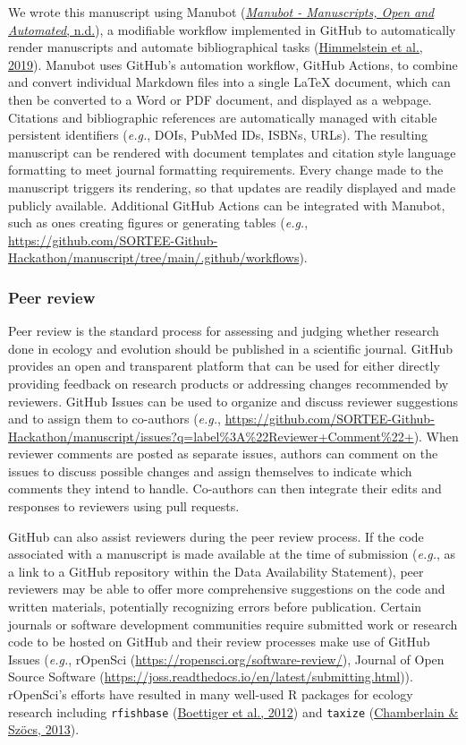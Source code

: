We wrote this manuscript using Manubot (\protect\hyperlink{ref-Re6Eg2va}{\emph{Manubot - Manuscripts, Open and Automated}, n.d.}), a modifiable workflow implemented in GitHub to automatically render manuscripts and automate bibliographical tasks (\protect\hyperlink{ref-YuJbg3zO}{Himmelstein et al., 2019}).
Manubot uses GitHub's automation workflow, GitHub Actions, to combine and convert individual Markdown files into a single LaTeX document, which can then be converted to a Word or PDF document, and displayed as a webpage.
Citations and bibliographic references are automatically managed with citable persistent identifiers (\emph{e.g.}, DOIs, PubMed IDs, ISBNs, URLs).
The resulting manuscript can be rendered with document templates and citation style language formatting to meet journal formatting requirements.
Every change made to the manuscript triggers its rendering, so that updates are readily displayed and made publicly available.
Additional GitHub Actions can be integrated with Manubot, such as ones creating figures or generating tables (\emph{e.g.}, \url{https://github.com/SORTEE-Github-Hackathon/manuscript/tree/main/.github/workflows}).

\hypertarget{peer-review}{%
\subsubsection{Peer review}\label{peer-review}}

Peer review is the standard process for assessing and judging whether research done in ecology and evolution should be published in a scientific journal.
GitHub provides an open and transparent platform that can be used for either directly providing feedback on research products or addressing changes recommended by reviewers.
GitHub Issues can be used to organize and discuss reviewer suggestions and to assign them to co-authors (\emph{e.g.}, \url{https://github.com/SORTEE-Github-Hackathon/manuscript/issues?q=label\%3A\%22Reviewer+Comment\%22+}).
When reviewer comments are posted as separate issues, authors can comment on the issues to discuss possible changes and assign themselves to indicate which comments they intend to handle.
Co-authors can then integrate their edits and responses to reviewers using pull requests.

GitHub can also assist reviewers during the peer review process.
If the code associated with a manuscript is made available at the time of submission (\emph{e.g.}, as a link to a GitHub repository within the Data Availability Statement), peer reviewers may be able to offer more comprehensive suggestions on the code and written materials, potentially recognizing errors before publication.
Certain journals or software development communities require submitted work or research code to be hosted on GitHub and their review processes make use of GitHub Issues (\emph{e.g.}, rOpenSci (\url{https://ropensci.org/software-review/}), Journal of Open Source Software (\url{https://joss.readthedocs.io/en/latest/submitting.html})).
rOpenSci's efforts have resulted in many well-used R packages for ecology research including \texttt{rfishbase} (\protect\hyperlink{ref-Xsdcv6q}{Boettiger et al., 2012}) and \texttt{taxize} (\protect\hyperlink{ref-FVBWKkZu}{Chamberlain \& Szöcs, 2013}).

